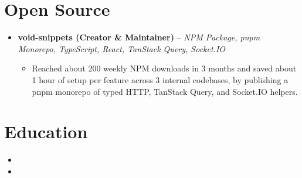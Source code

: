\documentclass[11pt,a4paper,sans]{moderncv}
\begin{document}

\section{Open Source}
\vspace{1pt}
\begin{itemize}
\item \textbf{void-snippets (Creator \& Maintainer)} -- \textit{NPM Package, pnpm Monorepo, TypeScript, React, TanStack Query, Socket.IO}
\begin{itemize}
    \item Reached about 200 weekly NPM downloads in 3 months and saved about 1 hour of setup per feature across 3 internal codebases, by publishing a pnpm monorepo of typed HTTP, TanStack Query, and Socket.IO helpers.
\end{itemize}
\end{itemize}


\section{Education}
\vspace{1pt}
\begin{itemize}

\item{}

\vspace{3pt}

\item{}

\end{itemize}

\end{document}
